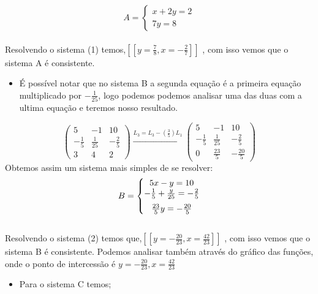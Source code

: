 \documentclass{article}
\begin{document}
      \begin{equation}
      A = \left\{\begin{matrix} x+2y=2\\  7y=8 \end{matrix}\right.
      \end{equation}
      \\
      Resolvendo o sistema (1) temos,$\left [ \left [ y=\frac{7}{8}  , x=-\frac{2}{7}  \right ] \right ]$ , com isso vemos que o sistema A é consistente.
      \begin{itemize}
          \item É possível notar que no sistema B a segunda equação é a primeira equação multiplicado por $ -\frac{1}{25}$, logo podemos podemos analisar uma das duas com a ultima equação e teremos nosso resultado. \bigskip
          
      \end{itemize}
      \begin{equation*}
      \begin{pmatrix} 5 &-1  &10 \\-\frac{1}{5}& \frac{1}{25} & -\frac{2}{5} \\ 3 & 4 & 2 \end{pmatrix}
      \xrightarrow[]{L_3=L_3-(\frac{3}{5})L_1}
      \begin{pmatrix} 5 &-1  &10 \\-\frac{1}{5}& \frac{1}{25} & -\frac{2}{5} \\ 0 & \frac{23}{5} & -\frac{20}{5} \end{pmatrix}
      \end{equation*}
      Obtemos assim um sistema mais simples de se resolver:
      \begin{equation}
        B = \left\{\begin{matrix} 5x - y = 10 \\ \medskip -\frac{1}{5} + \frac{y}{25} = -\frac{2}{5} \\  \frac{23}{5}y= -\frac{20}{5} \end{matrix}\right.
      \end{equation}
       \\ 
       Resolvendo o sistema (2) temos que,$\left [ \left [ y=-\frac{20}{23}  , x=\frac{42}{23}  \right ] \right ]$ , com isso vemos que o sistema B é consistente.
    Podemos analisar também através do gráfico das funções, onde o ponto de intercessão é $ y=-\frac{20}{23}  , x=\frac{42}{23} $
    
    \begin{center}
    \end{center}


      \begin{itemize}
          \item Para o sistema C temos;
      \end{itemize}
 
\end{document}

